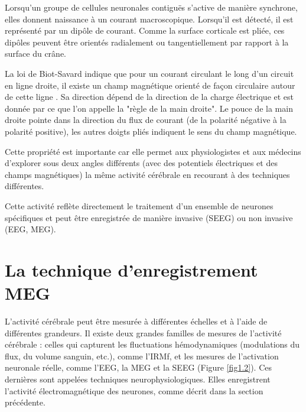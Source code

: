 \vspace{2ex}
Lorsqu'un groupe de cellules neuronales contiguës s'active de manière synchrone, elles donnent naissance à un courant macroscopique. Lorsqu'il est détecté, il est représenté par un dipôle de courant. Comme la surface corticale est pliée, ces dipôles peuvent être orientés radialement ou tangentiellement par rapport à la surface du crâne.

\vspace{2ex}
La loi de Biot-Savard indique que pour un courant circulant le long d'un circuit en ligne droite, il existe un champ magnétique orienté de façon circulaire autour de cette ligne \cite{11}. Sa direction dépend de la direction de la charge électrique et est donnée par ce que l'on appelle la "règle de la main droite". Le pouce de la main droite pointe dans la direction du flux de courant (de la polarité négative à la polarité positive), les autres doigts pliés indiquent le sens du champ magnétique.

\vspace{2ex}
Cette propriété est importante car elle permet aux physiologistes et aux médecins d'explorer sous deux angles différents (avec des potentiels électriques et des champs magnétiques) la même activité cérébrale en recourant à des techniques différentes.

\vspace{2ex}
Cette activité reflète directement le traitement d'un ensemble de neurones spécifiques et peut être enregistrée de manière invasive (SEEG) ou non invasive (EEG, MEG).

\section{La technique d’enregistrement MEG}

L'activité cérébrale peut être mesurée à différentes échelles et à l'aide de différentes grandeurs. Il existe deux grandes familles de mesures de l'activité cérébrale : celles qui capturent les fluctuations hémodynamiques (modulations du flux, du volume sanguin, etc.), comme l'IRMf, et les mesures de l'activation neuronale réelle, comme l'EEG, la MEG et la SEEG (Figure \ref{fig1.2}). Ces dernières sont appelées techniques neurophysiologiques. Elles enregistrent l'activité électromagnétique des neurones, comme décrit dans la section précédente.

